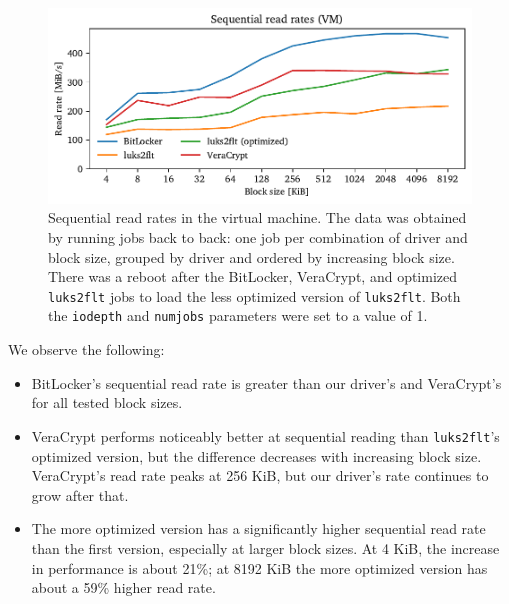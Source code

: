 \begin{figure}[htb!]
	\center
	\includegraphics[scale=1]{../fig/performance.vmexperiments.seq.pdf}
	\caption[
		Sequential read rates in the virtual machine
	]{
		Sequential read rates in the virtual machine. The data was obtained by running jobs back to back: one job per combination of driver and block size, grouped by driver and ordered by increasing block size. There was a reboot after the BitLocker, VeraCrypt, and optimized \texttt{luks2flt} jobs to load the less optimized version of \texttt{luks2flt}. Both the \texttt{iodepth} and \texttt{numjobs} parameters were set to a value of 1.
	}
	\label{fig:performance.vmexperiments.seq}
\end{figure}

We observe the following:
\begin{itemize}[beginpenalty=10000]
	\item BitLocker's sequential read rate is greater than our driver's and VeraCrypt's for all tested block sizes.
	\item VeraCrypt performs noticeably better at sequential reading than \texttt{luks2flt}'s optimized version, but the difference decreases with increasing block size. VeraCrypt's read rate peaks at 256 KiB, but our driver's rate continues to grow after that.
	\item The more optimized version has a significantly higher sequential read rate than the first version, especially at larger block sizes. At 4 KiB, the increase in performance is about 21\%; at 8192 KiB the more optimized version has about a 59\% higher read rate.
\end{itemize}

